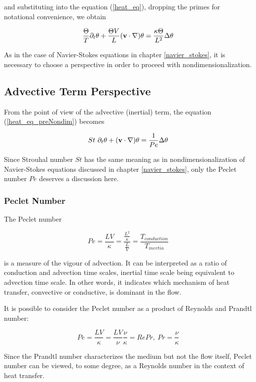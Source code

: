 and substituting into the equation (\ref{heat_eq}), dropping the primes for notational convenience, we obtain

\begin{equation} \label{heat_eq_preNondim}
 \frac{\Theta}{T} \partial_t\theta + \frac{\Theta V}{L} (\mathbf{v} \cdot \nabla)\theta = \frac{\kappa \Theta}{L^2} \Delta\theta 
\end{equation}

As in the case of Navier-Stokes equations in chapter \ref{navier_stokes}, it is necessary to choose a perspective in order to proceed with nondimensionalization.

\subsection{Advective Term Perspective}

From the point of view of the advective (inertial) term, the equation (\ref{heat_eq_preNondim}) becomes

\begin{equation} \label{heat_eq_inertNondim}
 St~ \partial_t\theta + (\mathbf{v} \cdot \nabla)\theta = \frac{1}{Pe} \Delta\theta  
\end{equation}
 
Since Strouhal number $St$ has the same meaning as in nondimensionalization of Navier-Stokes equations discussed in chapter \ref{navier_stokes}, only the Peclet number $Pe$ deserves a discussion here.

\subsubsection{Peclet Number}

The Peclet number 

$$ Pe = \frac{LV}{\kappa} = \frac{\frac{L^2}{\kappa}}{\frac{L}{V}} = \frac{T_{conduction}}{T_{inertia}} $$

is a measure of the vigour of advection. It can be interpreted as a ratio of conduction and advection time scales, inertial time scale being equivalent to advection time scale. In other words, it indicates which mechanism of heat transfer, convective or conductive, is dominant in the flow.

It is possible to consider the Peclet number as a product of Reynolds and Prandtl number:

$$ Pe = \frac{LV}{\kappa} = \frac{LV}{\nu} \frac{\nu}{\kappa} = RePr, ~ Pr = \frac{\nu}{\kappa} $$

Since the Prandtl number characterizes the medium but not the flow itself, Peclet number can be viewed, to some degree, as a Reynolds number in the context of heat transfer.

